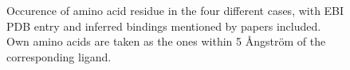 \documentclass[10pt]{article}\usepackage[]{graphicx}\usepackage[]{color}
\theoremstyle{plain}
\begin{document}
\begin{multicols*}{2}
\begin{Schunk}
\begin{figure}[H]
{}

\caption[Occurence of amino acid residue in the four different cases, with EBI PDB entry and inferred bindings mentioned by papers included]{Occurence of amino acid residue in the four different cases, with EBI PDB entry and inferred bindings mentioned by papers included. Own amino acids are taken as the ones within 5 Ångström of the corresponding ligand.}\label{fig:aa_found}
\end{figure}
\end{Schunk}



\end{multicols*}
\end{document}
